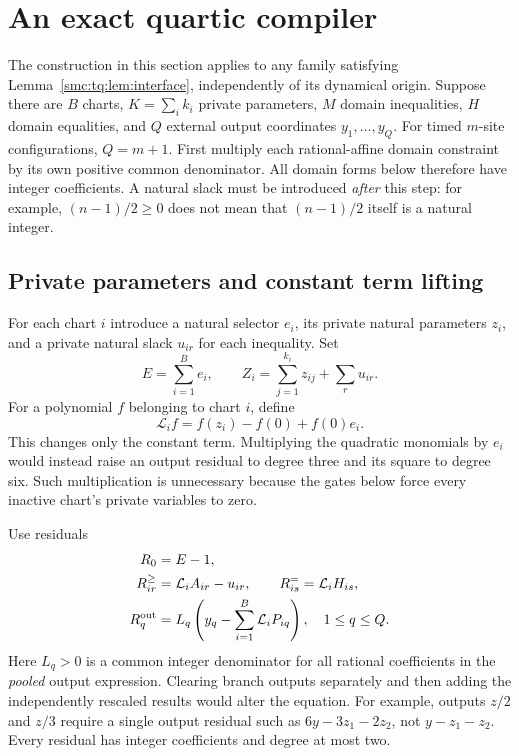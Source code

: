 \documentclass[11pt,letterpaper]{article}
\numberwithin{equation}{section}
\theoremstyle{definition}
\theoremstyle{remark}
\newcommand{\Lift}{\mathcal L}\newcommand{\inorm}[1]{\lVert#1\rVert_\infty}
\begin{document}
\section{An exact quartic compiler}\label{smc:tq:sec:compiler}
The construction in this section applies to any family satisfying
Lemma~\ref{smc:tq:lem:interface}, independently of its dynamical origin.
Suppose there are $B$ charts, $K=\sum_i k_i$ private parameters,
$M$ domain inequalities, $H$ domain equalities, and $Q$ external output
coordinates $y_1,\ldots,y_Q$. For timed $m$-site configurations, $Q=m+1$.
First multiply each rational-affine domain constraint by its own positive
common denominator. All domain forms below therefore have integer
coefficients. A natural slack must be introduced \emph{after} this step:
for example, $(n-1)/2\ge0$ does not mean that $(n-1)/2$ itself is a natural
integer.

\subsection{Private parameters and constant term lifting}
For each chart $i$ introduce a natural selector $e_i$, its private natural
parameters $z_i$, and a private natural slack $u_{ir}$ for each inequality.
Set
\[
 E=\sum_{i=1}^{B}e_i,\qquad
 Z_i=\sum_{j=1}^{k_i}z_{ij}+\sum_r u_{ir}.
\]
For a polynomial $f$ belonging to chart $i$, define
\begin{equation}\label{smc:tq:eq:lift}
 \Lift_i f=f(z_i)-f(0)+f(0)e_i.
\end{equation}
This changes only the constant term. Multiplying the quadratic monomials
by $e_i$ would instead raise an output residual to degree three and its
square to degree six. Such multiplication is unnecessary because the gates
below force every inactive chart's private variables to zero.

Use residuals
\begin{align}
 R_0&=E-1,\nonumber\\
 R_{ir}^{\ge}&=\Lift_i A_{ir}-u_{ir},\qquad
 R_{is}^{=}=\Lift_i H_{is},\label{smc:tq:eq:domainres}\\
 R_q^{\rm out}&=L_q\left(y_q-\sum_{i=1}^{B}\Lift_i P_{iq}\right),
 \quad 1\le q\le Q.\label{smc:tq:eq:outres}
\end{align}
Here $L_q>0$ is a common integer denominator for all rational coefficients
in the \emph{pooled} output expression. Clearing branch outputs separately
and then adding the independently rescaled results would alter the equation.
For example, outputs $z/2$ and $z/3$ require a single output residual such
as $6y-3z_1-2z_2$, not $y-z_1-z_2$.
Every residual has integer coefficients and degree at most two.
\end{document}
